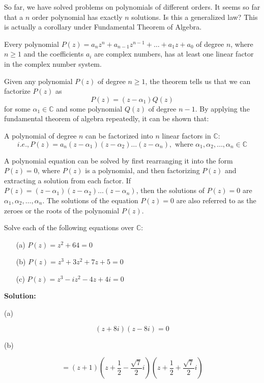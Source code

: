 So far, we have solved problems on polynomials of different orders. It seems so far that a $n$ order
polynomial has exactly $n$ solutions. Is this a generalized law? This is actually a corollary under Fundamental Theorem of
Algebra.
\begin{theorem}
    Every polynomial \( P(z) = a_nz^n + a_{n-1}z^{n-1} + \ldots + a_1z + a_0 \) of degree \( n \), where \( n \geq 1 \) and the coefficients \( a_i \) are complex numbers, has at least one linear factor in the complex number system.
\end{theorem}
Given any polynomial \( P(z) \) of degree \( n \geq 1 \), the theorem tells us that we can factorize \( P(z) \) as
\[ P(z) = (z - \alpha_1)Q(z) \]
for some \( \alpha_1 \in \mathbb{C} \) and some polynomial \( Q(z) \) of degree \( n - 1 \).
By applying the fundamental theorem of algebra repeatedly, it can be shown that:
\begin{corollary}
    A polynomial of degree \( n \) can be factorized into \( n \) linear factors in \( \mathbb{C} \):
\[ i.e., P(z) = a_n(z - \alpha_1)(z - \alpha_2)\ldots(z - \alpha_n), \text{ where } \alpha_1, \alpha_2, \ldots, \alpha_n \in \mathbb{C} \]
\end{corollary}
A polynomial equation can be solved by first rearranging it into the form \( P(z) = 0 \), where \( P(z) \) is a polynomial, and then factorizing \( P(z) \) and extracting a solution from each factor.
If \( P(z) = (z - \alpha_1)(z - \alpha_2)\ldots(z - \alpha_n) \), then the solutions of \( P(z) = 0 \) are \( \alpha_1, \alpha_2, \ldots, \alpha_n \). The solutions of the equation \( P(z) = 0 \) are also referred to as the zeroes or the roots of the polynomial \( P(z) \).
\begin{example}
    Solve each of the following equations over \(\mathbb{C}\):
    \begin{itemize}
        \item[(a)] \( P(z) = z^2 + 64 = 0 \)
        \item[(b)] \( P(z) = z^3 + 3z^2 + 7z + 5 = 0 \)
        \item[(c)] \( P(z) = z^3 - iz^2 - 4z + 4i = 0 \)
    \end{itemize}
\end{example}
\textbf{Solution:}

(a)

\[
(z + 8i)(z - 8i) = 0
\]


(b)

\[
= (z + 1)\left(z + \frac{1}{2} - \frac{\sqrt{7}}{2}i\right)\left(z + \frac{1}{2} + \frac{\sqrt{7}}{2}i\right)
\]

